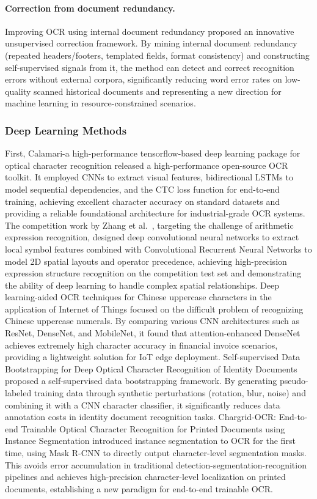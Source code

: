 \paragraph{Correction from document redundancy.}
Improving OCR using internal document redundancy \cite{lund2011redundancy} proposed an innovative unsupervised correction framework. By mining internal document redundancy (repeated headers/footers, templated fields, format consistency) and constructing self-supervised signals from it, the method can detect and correct recognition errors without external corpora, significantly reducing word error rates on low-quality scanned historical documents and representing a new direction for machine learning in resource-constrained scenarios.
\subsubsection{Deep Learning Methods}
First, Calamari-a high-performance tensorflow-based deep learning package for optical character recognition \cite{wick2018calamari} released a high-performance open-source OCR toolkit. It employed CNNs to extract visual features, bidirectional LSTMs to model sequential dependencies, and the CTC loss function for end-to-end training, achieving excellent character accuracy on standard datasets and providing a reliable foundational architecture for industrial-grade OCR systems. The competition work by Zhang et al.~\cite{zhang2018baidu}, targeting the challenge of arithmetic expression recognition, designed deep convolutional neural networks to extract local symbol features combined with Convolutional Recurrent Neural Networks to model 2D spatial layouts and operator precedence, achieving high-precision expression structure recognition on the competition test set and demonstrating the ability of deep learning to handle complex spatial relationships. Deep learning-aided OCR techniques for Chinese uppercase characters in the application of Internet of Things \cite{liu2019chineseocr} focused on the difficult problem of recognizing Chinese uppercase numerals. By comparing various CNN architectures such as ResNet, DenseNet, and MobileNet, it found that attention-enhanced DenseNet achieves extremely high character accuracy in financial invoice scenarios, providing a lightweight solution for IoT edge deployment. Self-supervised Data Bootstrapping for Deep Optical Character Recognition of Identity Documents \cite{chiron2019selfsupervised} proposed a self-supervised data bootstrapping framework. By generating pseudo-labeled training data through synthetic perturbations (rotation, blur, noise) and combining it with a CNN character classifier, it significantly reduces data annotation costs in identity document recognition tasks. Chargrid-OCR: End-to-end Trainable Optical Character Recognition for Printed Documents using Instance Segmentation \cite{keremberke2021chargrid} introduced instance segmentation to OCR for the first time, using Mask R-CNN to directly output character-level segmentation masks. This avoids error accumulation in traditional detection-segmentation-recognition pipelines and achieves high-precision character-level localization on printed documents, establishing a new paradigm for end-to-end trainable OCR.

